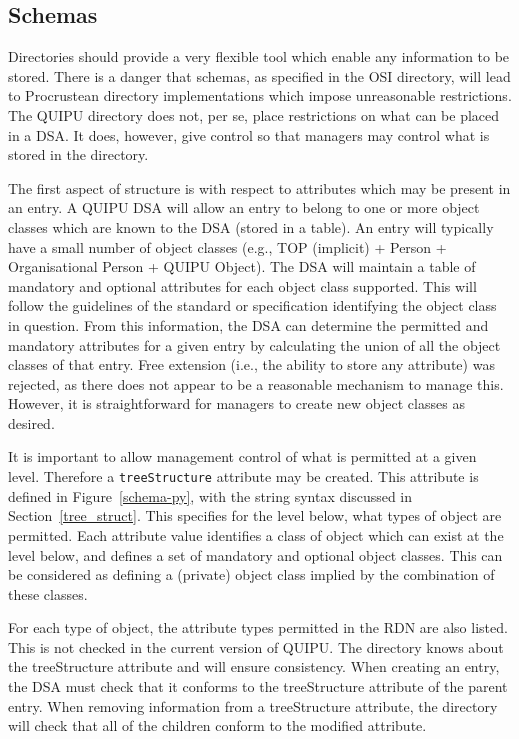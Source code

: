 \subsection {Schemas}
\label{quipu:schema}

Directories should provide a very flexible tool
which enable any information to be stored.  There is a danger that schemas,
as specified in the OSI directory, will lead to Procrustean directory implementations
which impose unreasonable restrictions.  The QUIPU directory does not, per
se, place restrictions on what can be placed in a DSA.
It does, however, give control so that managers may control what is stored in the
directory.

The first aspect of structure is with respect to attributes which may be
present in an entry.  A QUIPU DSA will allow an entry to belong to one or
more object classes which are known to the DSA (stored in a table).  An
entry will typically have a small number of object classes (e.g., TOP
(implicit) + Person + Organisational Person + QUIPU Object).  The DSA will
maintain a table of mandatory and optional attributes for each object class
supported.  This will follow the guidelines of the standard or
specification identifying the object class in question.  From this
information, the DSA can determine the permitted and mandatory attributes for a
given entry by calculating the union of all the object classes of that
entry.  Free extension (i.e., the ability to store any attribute) was
rejected, as there does not appear to be a reasonable mechanism to manage
this.  However, it is straightforward for managers to create new object
classes as desired.


It is important 
to allow management control of what is permitted at a given level.
Therefore a \verb+treeStructure+
attribute may be created.  
This attribute is defined in Figure~\ref{schema-py}, with the string syntax
discussed in Section~\ref{tree_struct}.
This specifies for the level below,
what types of object are permitted.  
Each attribute value identifies a class of object which can exist at the level
below, and 
defines a set of mandatory and optional object classes.
This can be considered as defining a (private) object class implied by the
combination of these classes.

For each type of object, the attribute types permitted in the RDN are also
listed.  This is not checked in the current version of QUIPU.
The directory knows about the treeStructure attribute and will
ensure consistency.  
When creating an entry, the DSA must check that it conforms to the
treeStructure attribute of the parent entry.
When removing information from a treeStructure attribute, the
directory will  check that all of the children conform to the
modified attribute.

